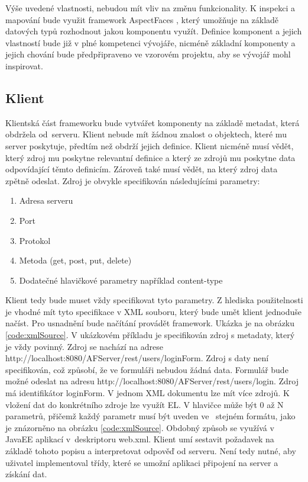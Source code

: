 Výše uvedené vlastnosti, nebudou mít vliv na změnu funkcionality. K inspekci a mapování bude využit framework AspectFaces \cite{aspectfaces}, který umožňuje na základě datových typů rozhodnout jakou komponentu využít. Definice komponent a jejich vlastností bude již v plné kompetenci vývojáře, nicméně základní komponenty a jejich chování bude předpřipraveno ve vzorovém projektu, aby se vývojář mohl inspirovat.

\subsection{Klient}
Klientská část frameworku bude vytvářet komponenty na základě metadat, která obdržela od~serveru. Klient nebude mít žádnou znalost o objektech, které mu server poskytuje, předtím než obdrží jejich definice. Klient nicméně musí vědět, který zdroj mu poskytne relevantní definice a který ze zdrojů mu poskytne data odpovídající těmto definicím. Zároveň také musí vědět, na který zdroj data zpětně odeslat. Zdroj je obvykle specifikován následujícími parametry:
\begin{enumerate}
\item Adresa serveru
\item Port
\item Protokol
\item Metoda (get, post, put, delete)
\item Dodatečné hlavičkové parametry například content-type
\end{enumerate}
Klient tedy bude muset vždy specifikovat tyto parametry. Z hlediska použitelnosti je vhodné mít tyto specifikace v XML souboru, který bude umět klient jednoduše načíst. Pro usnadnění bude načítání provádět framework. Ukázka je na obrázku \ref{code:xmlSource}. V ukázkovém příkladu je specifikován zdroj s metadaty, který je vždy povinný. Zdroj se nachází na adrese\\ http://localhost:8080/AFServer/rest/users/loginForm. Zdroj s daty není specifikován, což způsobí, že ve formuláři nebudou žádná data. Formulář bude možné odeslat na adresu http://localhost:8080/AFServer/rest/users/login. Zdroj má identifikátor loginForm. V jednom XML dokumentu lze mít více zdrojů. K vložení dat do konkrétního zdroje lze využít EL. V hlavičce může být 0 až N parametrů, přičemž každý parametr musí být uveden ve~	stejném formátu, jako je znázorněno na obrázku \ref{code:xmlSource}. Obdobný způsob se využívá v JavaEE aplikací v~deskriptoru web.xml. Klient umí sestavit požadavek na základě tohoto popisu a interpretovat odpověď od serveru. Není tedy nutné, aby uživatel implementoval třídy, které se umožní aplikaci připojení na server a získání dat.


